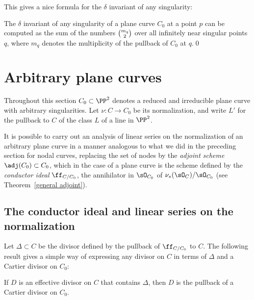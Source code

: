 This gives a nice formula for the $\delta$ invariant of any singularity:

\begin{corollary}
\label{computing delta}
The $\delta$ invariant of any singularity of a plane curve $C_{0}$ at
a point $p$ can be computed as the sum of the numbers $\tbinom{m_{q}}{2}$
over all infinitely near singular points $q$,
%
where
$m_{q}$
denotes the multiplicity of the pullback of $C_{0}$ at $q$.\qed
\end{corollary}

\section{Arbitrary plane curves} \label{arbitrary plane curves}

Throughout this section $C_0 \subset \PP^2$ denotes a reduced and
irreducible plane curve with arbitrary singularities. Let $\nu : C
\to C_0$ be its normalization, and write $L'$ for the pullback to $C$
of the class $L$ of a line in $\PP^{2}$.

It is possible to carry out an analysis of linear series on the
normalization of an arbitrary plane curve in a manner  analogous to
%
what we did in the preceding section for nodal curves, replacing
the set of nodes by the
\emph{adjoint scheme}
%
%
$\adj(C_{0})\subset C_{0}$, which in the case of a plane curve is the scheme
%
%
defined by the \emph{conductor ideal} $\ff_{C/C_0}$, the annihilator
in $\sO_{C_{0}}$ of $\nu_{*}(\sO_{C})/\sO_{C_{0}}$
(see Theorem~\ref{general adjoint}).

\subsection*{The conductor ideal and linear series on the normalization}

Let
$\Delta\subset C$ be the
divisor
defined by the pullback of $\ff_{C/C_0}$ to $C$.
The following result gives a simple way of expressing any divisor on $C$
%
in terms of $\Delta$ and a
Cartier divisor on $C_{0}$:

\begin{theorem}\label{Cartier on C}
If $D$ is an effective divisor on $C$ that contains $\Delta$,
then $D$ is the pullback of a Cartier divisor on $C_{0}$.
\unif
\end{theorem}

